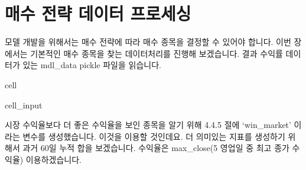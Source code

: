 \documentclass[letterpaper,10pt,english]{jupyterBook}
\begin{document}
\part{ 매수 전략 데이터 프로세싱}
\label{\detokenize{chapter4/4.4.4_Data_Processing:id2}}
\sphinxAtStartPar
모델 개발을 위해서는 매수 전략에 따라 매수 종목을 결정할 수 있어야 합니다. 이번 장에서는 기본적인 매수 종목을 찾는 데이터처리를 진행해 보겠습니다. 결과 수익률 데이터가 있는
mdl\_data pickle 파일을 읽습니다.

\begin{sphinxuseclass}{cell}\begin{sphinxVerbatimInput}

\begin{sphinxuseclass}{cell_input}
\begin{sphinxVerbatim}[commandchars=\\\{\}]
  
\end{sphinxVerbatim}

\end{sphinxuseclass}\end{sphinxVerbatimInput}

\end{sphinxuseclass}
\sphinxAtStartPar
 시장 수익율보다 더 좋은 수익율을 보인 종목을 알기 위해 4.4.5 절에 ‘win\_market’ 이라는 변수를 생성했습니다. 이것을 이용할 것인데요. 더 의미있는 지표를 생성하기 위해서 과거 60일 누적 합을 보겠습니다. 수익율은 max\_close(5 영업일 중 최고 종가 수익율) 이용하겠습니다.
\end{document}
